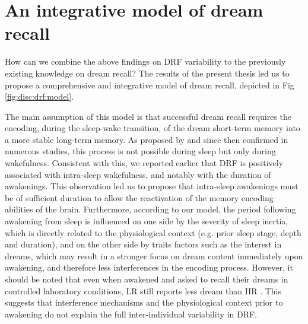 \section{An integrative model of dream recall}
\label{disc:drf:model}

How can we combine the above findings on DRF variability to the previously existing knowledge on dream recall?
The results of the present thesis led us to propose a comprehensive and integrative model of dream recall, depicted in Fig \ref{fig:disc:drf:model}.

The main assumption of this model is that successful dream recall requires the encoding, during the sleep-wake transition, of the dream short-term memory into a more stable long-term memory. As proposed by \citet{koulack_dream_1976} and since then confirmed in numerous studies, this process is not possible during sleep but only during wakefulness. Consistent with this, we reported earlier that DRF is positively associated with intra-sleep wakefulness, and notably with the duration of awakenings. This observation led us to propose that intra-sleep awakenings must be of sufficient duration to allow the reactivation of the memory encoding abilities of the brain. Furthermore, according to our model, the period following awakening from sleep is influenced on one side by the severity of sleep inertia, which is directly related to the physiological context (e.g. prior sleep stage, depth and duration), and on the other side by traits factors such as the interest in dreams, which may result in a stronger focus on dream content immediately upon awakening, and therefore less interferences in the encoding process. However, it should be noted that even when awakened and asked to recall their dreams in controlled laboratory conditions, LR still reports less dream than HR \citep{eichenlaub_brain_2014, eichenlaub_resting_2014}. This suggests that interference mechanisms and the physiological context prior to awakening do not explain the full inter-individual variability in DRF.

